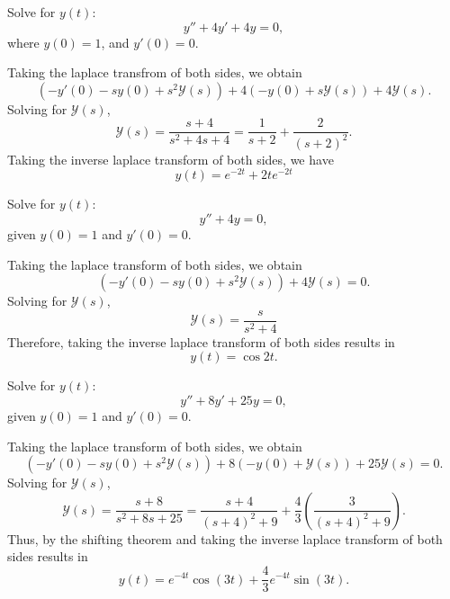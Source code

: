 \begin{example}
    Solve for $y(t)$:
    $$y''+4y'+4y = 0,$$
    where $y(0) = 1$, and $y'(0) = 0$.
\end{example}
\begin{soln}
    Taking the laplace transfrom of both sides, we obtain
    $$\left(-y'(0)-sy(0)+s^2\mathcal{Y}(s)\right)+4\left(-y(0)+s\mathcal{Y}(s)\right)+4\mathcal{Y}(s).$$
    Solving for $\mathcal{Y}(s)$,
    $$\mathcal{Y}(s) = \frac{s+4}{s^2+4s+4} = \frac{1}{s+2}+\frac{2}{(s+2)^2}.$$
    Taking the inverse laplace transform of both sides, we have
    $$y(t) = e^{-2t}+2te^{-2t}$$
\end{soln}

\begin{example}
    Solve for $y(t)$:
    $$y''+4y=0,$$
    given $y(0)=1$ and $y'(0)=0$.
\end{example}
\begin{soln}
    Taking the laplace transform of both sides, we obtain
    $$\left( -y'(0)-sy(0)+s^2\mathcal{Y}(s)\right)+4\mathcal{Y}(s) = 0.$$
    Solving for $\mathcal{Y}(s)$,
    $$\mathcal{Y}(s) = \frac{s}{s^2+4}$$
    Therefore, taking the inverse laplace transform of both sides results in
    $$y(t) = \cos 2t.$$
\end{soln}

\begin{example}
    Solve for $y(t)$:
    $$y''+8y'+25y=0,$$
    given $y(0)=1$ and $y'(0)=0$.
\end{example}
\begin{soln}
    Taking the laplace transform of both sides, we obtain
    $$\left(-y'(0)-sy(0)+s^2\mathcal{Y}(s)\right)+8\left( -y(0)+\mathcal{Y}(s)\right)+25\mathcal{Y}(s)=0.$$
    Solving for $\mathcal{Y}(s)$,
    $$\mathcal{Y}(s) = \frac{s+8}{s^2+8s+25} = \frac{s+4}{(s+4)^2+9}+\frac{4}{3}\left(\frac{3}{(s+4)^2+9}\right).$$
    Thus, by the \alert{shifting theorem} and taking the inverse laplace transform of
    both sides results in
    $$y(t) = e^{-4t}\cos(3t) + \frac{4}{3}e^{-4t}\sin(3t).$$
\end{soln}

